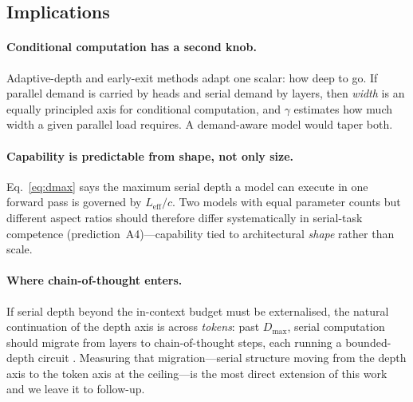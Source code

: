 \documentclass[11pt]{article}
\begin{document}
\subsection{Implications}
\paragraph{Conditional computation has a second knob.}
Adaptive-depth and early-exit methods
\citep{graves2016adaptive,elbayad2020depth,schuster2022confident,raposo2024mixture}
adapt one scalar: how deep to go. If parallel demand is carried by heads and
serial demand by layers, then \emph{width} is an equally principled axis for
conditional computation, and $\gamma$ estimates how much width a given parallel
load requires. A demand-aware model would taper both.

\paragraph{Capability is predictable from shape, not only size.}
Eq.~\eqref{eq:dmax} says the maximum serial depth a model can execute in one
forward pass is governed by $L_{\text{eff}}/c$. Two models with equal parameter
counts but different aspect ratios should therefore differ systematically in
serial-task competence (prediction~A4)---capability tied to architectural
\emph{shape} rather than scale.

\paragraph{Where chain-of-thought enters.}
If serial depth beyond the in-context budget must be externalised, the natural
continuation of the depth axis is across \emph{tokens}: past $D_{\max}$, serial
computation should migrate from layers to chain-of-thought steps, each running
a bounded-depth circuit \citep{merrill2024cot,li2024chain}. Measuring that
migration---serial structure moving from the depth axis to the token axis at
the ceiling---is the most direct extension of this work and we leave it to
follow-up.

\end{document}

